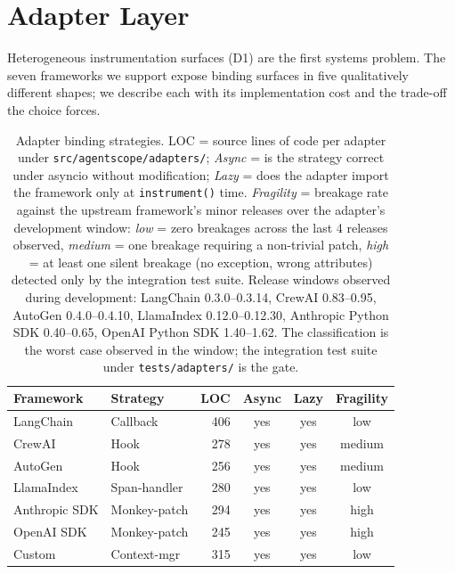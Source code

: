 \documentclass[sigplan,10pt,anonymous,review]{acmart}
\begin{document}
\section{Adapter Layer}
\label{sec:adapters}

Heterogeneous instrumentation surfaces (D1) are the first systems
problem. The seven frameworks we support expose binding surfaces in
five qualitatively different shapes; we describe each with its
implementation cost and the trade-off the choice forces.

\begin{table}[t]
\centering
\small
\caption{Adapter binding strategies. LOC = source lines of code per
adapter under \texttt{src/agentscope/adapters/}; \emph{Async} = is
the strategy correct under asyncio without modification; \emph{Lazy} =
does the adapter import the framework only at \texttt{instrument()}
time. \emph{Fragility} = breakage rate against the upstream framework's
minor releases over the adapter's development window: \emph{low} =
zero breakages across the last 4 releases observed, \emph{medium} =
one breakage requiring a non-trivial patch, \emph{high} = at least
one silent breakage (no exception, wrong attributes) detected only by
the integration test suite. Release windows observed during
development: LangChain 0.3.0--0.3.14, CrewAI 0.83--0.95, AutoGen
0.4.0--0.4.10, LlamaIndex 0.12.0--0.12.30, Anthropic Python SDK
0.40--0.65, OpenAI Python SDK 1.40--1.62. The classification is the
worst case observed in the window; the integration test suite under
\texttt{tests/adapters/} is the gate.}
\label{tab:adapters}
\begin{tabular}{@{}llrccc@{}}
\toprule
\textbf{Framework} & \textbf{Strategy} & \textbf{LOC}
  & \textbf{Async} & \textbf{Lazy} & \textbf{Fragility} \\
\midrule
LangChain     & Callback       & 406 & yes & yes & low    \\
CrewAI        & Hook           & 278 & yes & yes & medium \\
AutoGen       & Hook           & 256 & yes & yes & medium \\
LlamaIndex    & Span-handler   & 280 & yes & yes & low    \\
Anthropic SDK & Monkey-patch   & 294 & yes & yes & high   \\
OpenAI SDK    & Monkey-patch   & 245 & yes & yes & high   \\
Custom        & Context-mgr    & 315 & yes & yes & low    \\
\bottomrule
\end{tabular}
\end{table}
\end{document}
